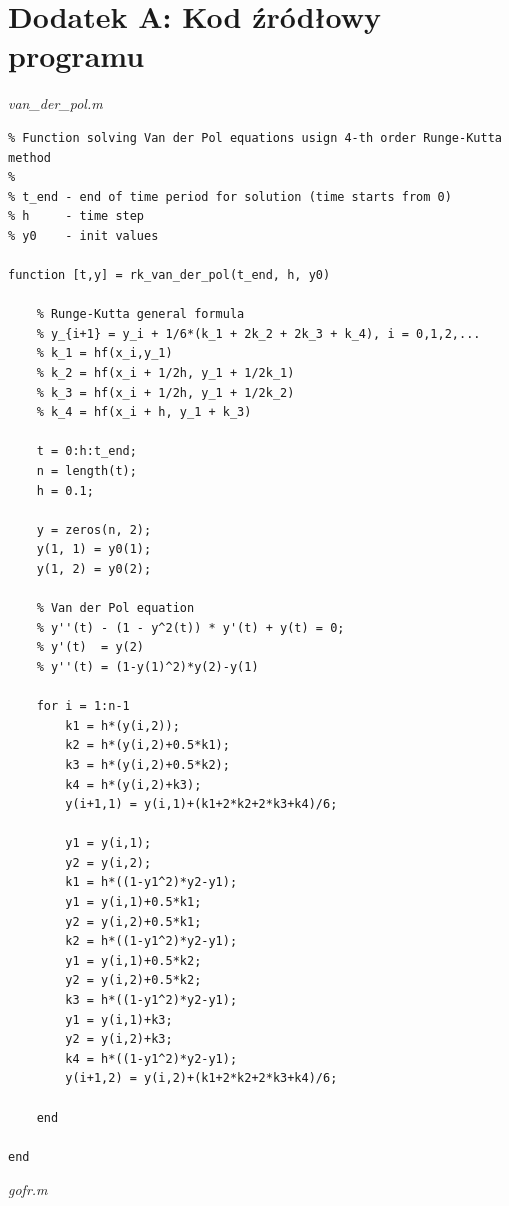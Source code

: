 \clearpage
{}
\section*{Dodatek A: Kod źródłowy programu}

\textit{van\_der\_pol.m}

\begin{lstlisting}
% Function solving Van der Pol equations usign 4-th order Runge-Kutta method
%
% t_end - end of time period for solution (time starts from 0)
% h     - time step
% y0    - init values

function [t,y] = rk_van_der_pol(t_end, h, y0)

    % Runge-Kutta general formula
    % y_{i+1} = y_i + 1/6*(k_1 + 2k_2 + 2k_3 + k_4), i = 0,1,2,...
    % k_1 = hf(x_i,y_1)
    % k_2 = hf(x_i + 1/2h, y_1 + 1/2k_1)
    % k_3 = hf(x_i + 1/2h, y_1 + 1/2k_2)    
    % k_4 = hf(x_i + h, y_1 + k_3)
    
    t = 0:h:t_end;
    n = length(t);
    h = 0.1;

    y = zeros(n, 2);
    y(1, 1) = y0(1);
    y(1, 2) = y0(2);
    
    % Van der Pol equation 
    % y''(t) - (1 - y^2(t)) * y'(t) + y(t) = 0;
    % y'(t)  = y(2)
    % y''(t) = (1-y(1)^2)*y(2)-y(1)

    for i = 1:n-1
        k1 = h*(y(i,2));
        k2 = h*(y(i,2)+0.5*k1);
        k3 = h*(y(i,2)+0.5*k2);
        k4 = h*(y(i,2)+k3);
        y(i+1,1) = y(i,1)+(k1+2*k2+2*k3+k4)/6;
        
        y1 = y(i,1);
        y2 = y(i,2);
        k1 = h*((1-y1^2)*y2-y1);
        y1 = y(i,1)+0.5*k1;
        y2 = y(i,2)+0.5*k1;
        k2 = h*((1-y1^2)*y2-y1);
        y1 = y(i,1)+0.5*k2;
        y2 = y(i,2)+0.5*k2;
        k3 = h*((1-y1^2)*y2-y1);
        y1 = y(i,1)+k3;
        y2 = y(i,2)+k3;
        k4 = h*((1-y1^2)*y2-y1);
        y(i+1,2) = y(i,2)+(k1+2*k2+2*k3+k4)/6;

    end
    
end

\end{lstlisting}

\textit{gofr.m}

